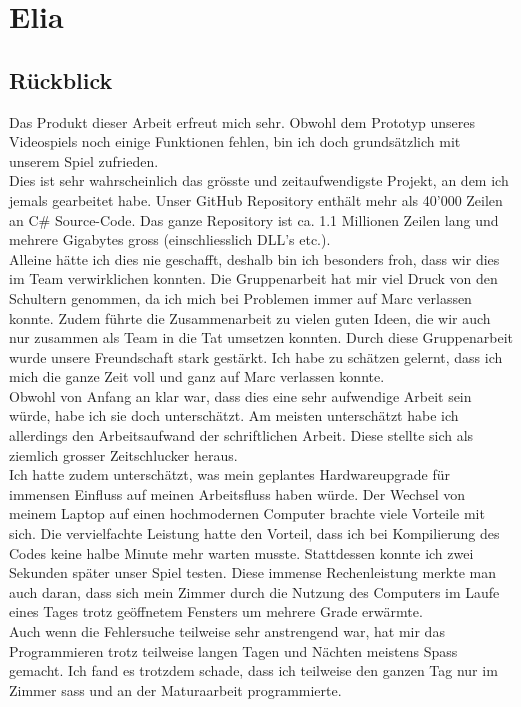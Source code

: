 \chapter{Elia}

\section{Rückblick}
Das Produkt dieser Arbeit erfreut mich sehr. Obwohl dem Prototyp unseres Videospiels noch einige Funktionen fehlen, bin ich doch grundsätzlich mit unserem Spiel zufrieden. \\
Dies ist sehr wahrscheinlich das grösste und zeitaufwendigste Projekt, an dem ich jemals gearbeitet habe. Unser GitHub Repository enthält mehr als 40'000 Zeilen an C\# Source-Code.
Das ganze Repository ist ca. 1.1 Millionen Zeilen lang und mehrere Gigabytes gross (einschliesslich DLL's etc.). \\
Alleine hätte ich dies nie geschafft, deshalb bin ich besonders froh, dass wir dies im Team verwirklichen konnten. Die Gruppenarbeit hat mir viel Druck von den Schultern genommen, da ich mich bei Problemen immer auf Marc
verlassen konnte. Zudem führte die Zusammenarbeit zu vielen guten Ideen, die wir auch nur zusammen als Team in die Tat umsetzen konnten. Durch diese Gruppenarbeit wurde unsere Freundschaft stark gestärkt.
Ich habe zu schätzen gelernt, dass ich mich die ganze Zeit voll und ganz auf Marc verlassen konnte.\\
Obwohl von Anfang an klar war, dass dies eine sehr aufwendige Arbeit sein würde, habe ich sie doch unterschätzt. Am meisten unterschätzt habe ich allerdings den Arbeitsaufwand der schriftlichen Arbeit. Diese stellte sich als ziemlich grosser Zeitschlucker heraus. \\
Ich hatte zudem unterschätzt, was mein geplantes Hardwareupgrade für immensen Einfluss auf meinen Arbeitsfluss haben würde. Der Wechsel von meinem Laptop auf einen hochmodernen Computer brachte viele Vorteile mit sich.
Die vervielfachte Leistung hatte den Vorteil, dass ich bei Kompilierung des Codes keine halbe Minute mehr warten musste. Stattdessen konnte ich zwei Sekunden später unser Spiel testen.
Diese immense Rechenleistung merkte man auch daran, dass sich mein Zimmer durch die Nutzung des Computers im Laufe eines Tages trotz geöffnetem Fensters um mehrere Grade erwärmte.\\
Auch wenn die Fehlersuche teilweise sehr anstrengend war, hat mir das Programmieren trotz teilweise langen Tagen und Nächten meistens Spass gemacht. Ich fand es trotzdem schade,
dass ich teilweise den ganzen Tag nur im Zimmer sass und an der Maturaarbeit programmierte. 

